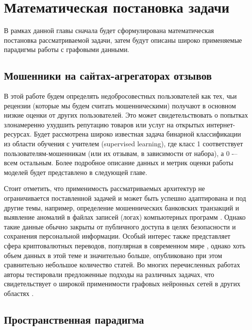 \section{Математическая постановка задачи}

В рамках данной главы сначала будет сформулирована математическая постановка рассматриваемой задачи, затем будут описаны широко применяемые парадигмы работы с графовыми данными.

\subsection{Мошенники на сайтах-агрегаторах отзывов}

В этой работе будем определять недобросовестных пользователей как тех, чьи рецензии (которые мы будем считать мошенническими) получают в основном низкие оценки от других пользователей. Это может свидетельствовать о попытках злонамеренно ухудшить репутацию товаров или услуг на открытых интернет-ресурсах. Будет рассмотрена широко известная задача бинарной классификации из области обучения с учителем (supervised learning), где класс 1 соответствует пользователям-мошенникам (или их отзывам, в зависимости от набора), а 0 -– всем остальным. Более подробное описание данных и метрик оценки работы моделей будет представлено в следующей главе.

Стоит отметить, что применимость рассматриваемых архитектур не ограничивается поставленной задачей и может быть успешно адаптирована и под другие темы, например, определение мошеннических банковских транзакций \cite{cheng2023} \cite{jesus2022} \cite{pozzolo2015} и выявление аномалий в файлах записей (логах) компьютерных программ \cite{pan2023}. Однако такие данные обычно закрыты от публичного доступа в целях безопасности и сохранения персональной информации. Особый интерес также представляет сфера криптовалютных переводов, популярная в современном мире \cite{ding2023} \cite{hu2023}, однако хоть объем данных в этой теме и значительно больше, опубликовано при этом сравнительно небольшое количество статей. Во многих перечисленных работах авторы тестировали предложенные подходы на различных задачах, что свидетельствует о широкой применимости графовых нейронных сетей в других областях \cite{li2023} \cite{sotiropoulos2023} \cite{tian2023} \cite{yin2024}.

\pagebreak



\subsection{Пространственная парадигма}

